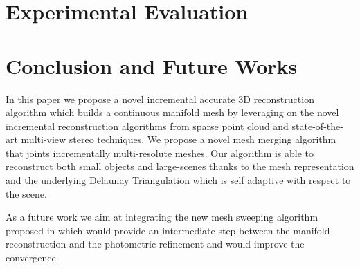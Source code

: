 \section{Experimental Evaluation}
\label{sec:exp}

\section{Conclusion and Future Works}
\label{sec:concl}
In this paper we propose a novel incremental accurate 3D reconstruction algorithm which builds a continuous manifold mesh by leveraging on the novel incremental reconstruction algorithms from sparse point cloud and state-of-the-art multi-view stereo techniques. 
We propose a novel mesh merging algorithm that joints incrementally multi-resolute meshes. 
Our algorithm is able to reconstruct both small objects and large-scenes thanks to the mesh representation and the underlying Delaunay Triangulation which is self adaptive with respect to the scene.

As a future work we aim at integrating the new mesh sweeping algorithm proposed in  \cite{romanoni16} which would provide an intermediate step between the manifold reconstruction and the photometric refinement and would improve the convergence.






